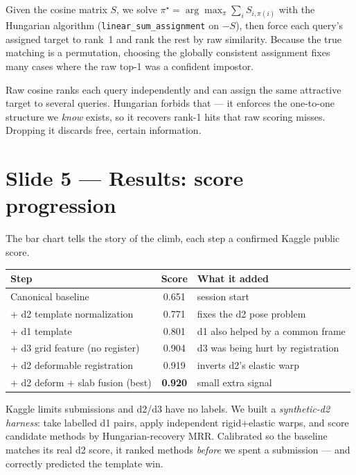 \documentclass[12pt,a4paper]{article}   %
\begin{document}
\begin{mathidea}
Given the cosine matrix $S$, we solve $\pi^\star=\arg\max_\pi\sum_i S_{i,\pi(i)}$ with the Hungarian
algorithm (\texttt{linear\_sum\_assignment} on $-S$), then force each query's assigned target to
rank~1 and rank the rest by raw similarity. Because the true matching is a permutation, choosing the
globally consistent assignment fixes many cases where the raw top-1 was a confident impostor.
\end{mathidea}

\begin{tradeoff}
Raw cosine ranks each query independently and can assign the same attractive target to several
queries. Hungarian forbids that --- it enforces the one-to-one structure we \emph{know} exists, so
it recovers rank-1 hits that raw scoring misses. Dropping it discards free, certain information.
\end{tradeoff}

\section{Slide 5 --- Results: score progression}
The bar chart tells the story of the climb, each step a confirmed Kaggle public score.

\begin{center}\begin{tabularx}{\textwidth}{@{}X c l@{}}
\toprule
\textbf{Step} & \textbf{Score} & \textbf{What it added}\\
\midrule
Canonical baseline & 0.651 & session start\\
+ d2 template normalization & 0.771 & fixes the d2 pose problem\\
+ d1 template & 0.801 & d1 also helped by a common frame\\
+ d3 grid feature (no register) & 0.904 & d3 was being hurt by registration\\
+ d2 deformable registration & 0.919 & inverts d2's elastic warp\\
+ d2 deform + slab fusion (best) & \textbf{0.920} & small extra signal\\
\bottomrule
\end{tabularx}\end{center}

\begin{noticethis}
Kaggle limits submissions and d2/d3 have no labels. We built a \emph{synthetic-d2 harness}: take
labelled d1 pairs, apply independent rigid+elastic warps, and score candidate methods by
Hungarian-recovery MRR. Calibrated so the baseline matches its real d2 score, it ranked methods
\emph{before} we spent a submission --- and correctly predicted the template win.
\end{noticethis}
\end{document}

